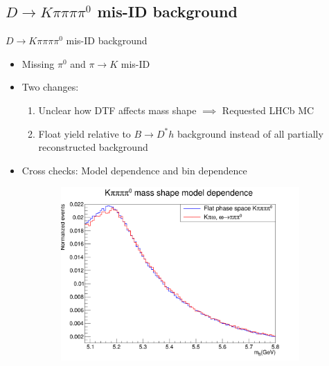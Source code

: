 \documentclass{beamer}
\begin{document}
\subsection{\texorpdfstring{$D\to K\pi\pi\pi\pi^0$}{D2Kpipipipi0} mis-ID background}
\begin{frame}{$D\to K\pi\pi\pi\pi^0$ mis-ID background}
  \begin{itemize}
    \setlength\itemsep{0.0em}
    \item{Missing $\pi^0$ and $\pi\to K$ mis-ID}
    \item{Two changes:}
    \begin{enumerate}
      \item{Unclear how DTF affects mass shape $\implies$ Requested LHCb MC}
      \item{Float yield relative to $B\to D^*h$ background instead of all partially reconstructed background}
    \end{enumerate}
    \item{Cross checks: Model dependence and bin dependence}
  \end{itemize}
  \begin{figure}
    \centering
    \begin{subfigure}{0.50\textwidth}
      \includegraphics[width = 1.0\textwidth]{Plots/Kpipipipi0_mass_shape_model_dependence.png}
    \end{subfigure}%
    \begin{subfigure}{0.50\textwidth}

\end{subfigure}
\end{figure}
\end{frame}
\end{document}
